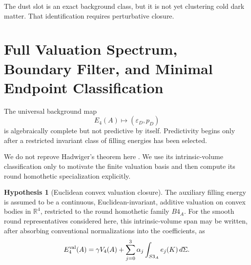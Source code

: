 \documentclass[11pt,a4paper]{article}
\def\Bfour{B4}%
\def\Sthree{S3}%
\def\dd{d}%
\numberwithin{equation}{section}
\theoremstyle{definition}
\newtheorem{hypothesis}[criterion]{Hypothesis}
\theoremstyle{plain}
\theoremstyle{remark}
\newcommand{\Sthree}{S^3}
\newcommand{\Bfour}{B^4}
\newcommand{\Efour}{E_4}
\newcommand{\epsD}{\varepsilon_D}
\newcommand{\pD}{p_D}
\newcommand{\dd}{\mathrm{d}}
\begin{document}
The dust slot is an exact background class, but it is not yet clustering cold dark matter. That identification requires perturbative closure.



\section{Full Valuation Spectrum, Boundary Filter, and Minimal Endpoint Classification}
The universal background map
\begin{equation}
\Efour(A)\longmapsto(\epsD,\pD)
\end{equation}
is algebraically complete but not predictive by itself. Predictivity begins only after a restricted invariant class of filling energies has been selected.

We do not reprove Hadwiger's theorem here \cite{Hadwiger1957,Schneider2014}. We use its intrinsic-volume classification only to motivate the finite valuation basis and then compute its round homothetic specialization explicitly.

\begin{hypothesis}[Euclidean convex valuation closure]
The auxiliary filling energy is assumed to be a continuous, Euclidean-invariant, additive valuation on convex bodies in \(\mathbb{R}^4\), restricted to the round homothetic family \(\Bfour_A\). For the smooth round representatives considered here, this intrinsic-volume span may be written, after absorbing conventional normalizations into the coefficients, as
\begin{equation}
\Efour^{\rm val}(A)
=\gamma V_4(A)
+\sum_{j=0}^{3}\alpha_j
\int_{\Sthree_A}e_j(K)\,\dd\Sigma .
\end{equation}
\end{hypothesis}
\end{document}
